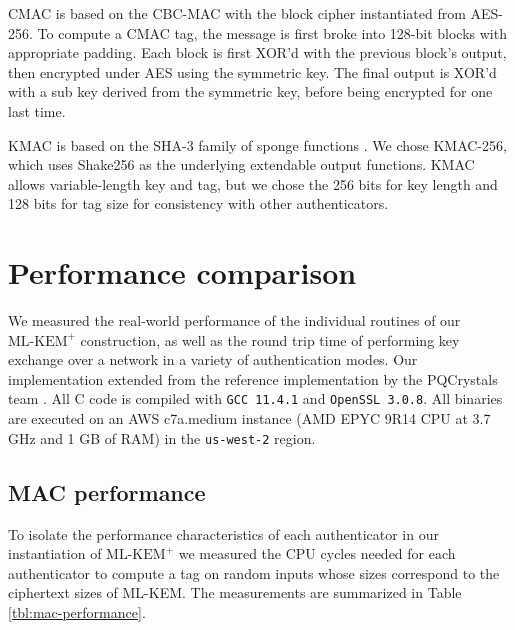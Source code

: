 \documentclass[journal=tches,submission]{iacrtrans}
\def\mlkemplus{\text{ML-KEM}^+}
\begin{document}
CMAC is based on the CBC-MAC with the block cipher instantiated from AES-256. To compute a CMAC tag, the message is first broke into 128-bit blocks with appropriate padding. Each block is first XOR'd with the previous block's output, then encrypted under AES using the symmetric key. The final output is XOR'd with a sub key derived from the symmetric key, before being encrypted for one last time.

KMAC is based on the SHA-3 family of sponge functions \cite{FIPS202}. We chose KMAC-256, which uses Shake256 as the underlying extendable output functions. KMAC allows variable-length key and tag, but we chose the 256 bits for key length and 128 bits for tag size for consistency with other authenticators.



\section{Performance comparison}\label{sec:performance-comparison}
We measured the real-world performance of the individual routines of our $\mlkemplus$ construction, as well as the round trip time of performing key exchange over a network in a variety of authentication modes. Our implementation extended from the reference implementation by the PQCrystals team \cite{kyberrefimpl}. All C code is compiled with \texttt{GCC 11.4.1} and \texttt{OpenSSL 3.0.8}. All binaries are executed on an AWS c7a.medium instance (AMD EPYC 9R14 CPU at 3.7 GHz and 1 GB of RAM) in the \texttt{us-west-2} region.

\subsection{MAC performance}
To isolate the performance characteristics of each authenticator in our instantiation of $\mlkemplus$ we measured the CPU cycles needed for each authenticator to compute a tag on random inputs whose sizes correspond to the ciphertext sizes of ML-KEM. The measurements are summarized in Table \ref{tbl:mac-performance}.
\end{document}
